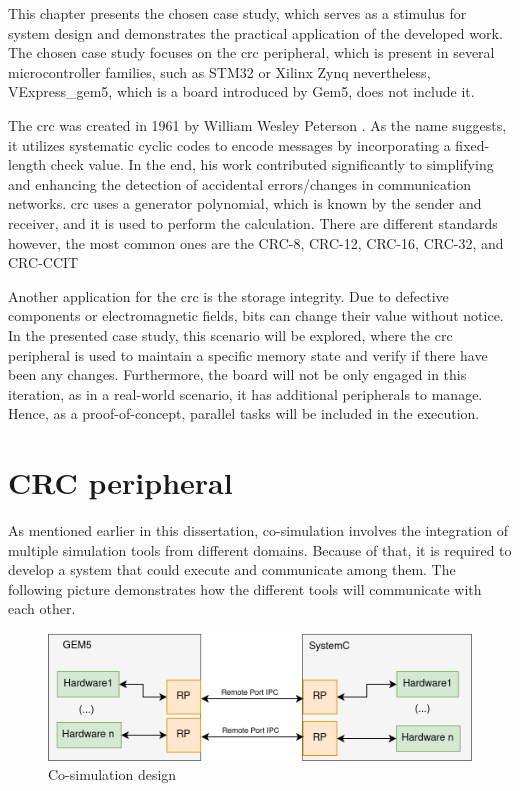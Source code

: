 
This chapter presents the chosen case study, which serves as a stimulus for system design and demonstrates 
the practical application of the developed work. The chosen case study focuses on the \gls{crc} peripheral,
which is present in several microcontroller families, such as STM32 \cite{referenceManualRM0385} or Xilinx Zynq \cite{xilinx2014zynq} 
nevertheless, VExpress\_gem5, which is a board introduced by Gem5, does not include it.

The \gls{crc} was created in 1961 by William Wesley Peterson \cite{peterson1961cyclic}. As the name suggests, 
it utilizes systematic cyclic codes to encode messages by incorporating a fixed-length check value. In the end, his work
contributed significantly to simplifying and enhancing the detection of accidental errors/changes in communication 
networks. \gls{crc} uses a generator polynomial, which is known by the sender and receiver, and it is used to 
perform the calculation. There are different standards however, the most common ones are the CRC-8, CRC-12, CRC-16, 
CRC-32, and CRC-CCIT \cite{borrelli2001ieee}

Another application for the \gls{crc} is the storage integrity. Due to defective components or electromagnetic fields,
bits can change their value without notice. In the presented case study, this scenario will be explored, where 
the \gls{crc} peripheral is used to maintain a specific memory state and verify if there have been any changes. 
Furthermore, the board will not be only engaged in this iteration, as in a real-world scenario, it has additional peripherals to manage. 
Hence, as a proof-of-concept, parallel tasks will be included in the execution.

\section{CRC peripheral} %

As mentioned earlier in this dissertation, co-simulation involves the integration of multiple simulation tools from different
domains. Because of that, it is required to develop a system that could execute and communicate among them. The following picture
demonstrates how the different tools will communicate with each other.

\begin{figure}[H]
	\centering
 	\includegraphics[width=0.8\linewidth]{Images/CoSimDesignSimplified.png}
 	\caption{Co-simulation design}
	 \label{fig_CoSimDesignSimplified}
\end{figure}

